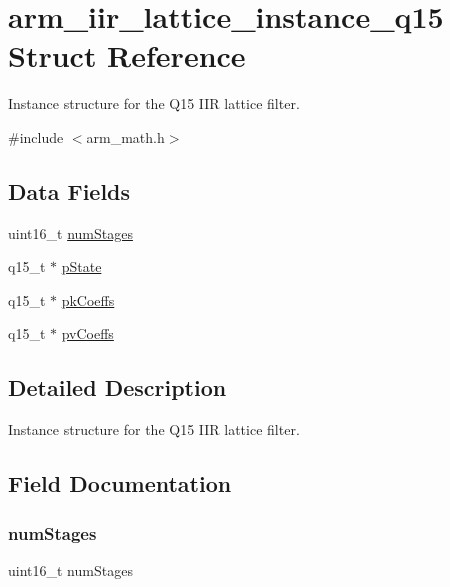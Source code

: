 \hypertarget{structarm__iir__lattice__instance__q15}{}\section{arm\+\_\+iir\+\_\+lattice\+\_\+instance\+\_\+q15 Struct Reference}
\label{structarm__iir__lattice__instance__q15}


Instance structure for the Q15 I\+IR lattice filter.  




{\ttfamily \#include $<$arm\+\_\+math.\+h$>$}

\subsection*{Data Fields}
\begin{DoxyCompactItemize}
\item 
uint16\+\_\+t \mbox{\hyperlink{structarm__iir__lattice__instance__q15_a4cceb90547b3e585d4c7aabaa8057212}{num\+Stages}}
\item 
q15\+\_\+t $\ast$ \mbox{\hyperlink{structarm__iir__lattice__instance__q15_ae29dfdb736374fcddaeaec4b7770170c}{p\+State}}
\item 
q15\+\_\+t $\ast$ \mbox{\hyperlink{structarm__iir__lattice__instance__q15_a12497c299b0341c18d497f8ab3465084}{pk\+Coeffs}}
\item 
q15\+\_\+t $\ast$ \mbox{\hyperlink{structarm__iir__lattice__instance__q15_a52866ed127c7b2a8a102e2ed1a2ebab8}{pv\+Coeffs}}
\end{DoxyCompactItemize}


\subsection{Detailed Description}
Instance structure for the Q15 I\+IR lattice filter. 

\subsection{Field Documentation}
\mbox{\label{structarm__iir__lattice__instance__q15_a4cceb90547b3e585d4c7aabaa8057212}} 
\subsubsection{\texorpdfstring{numStages}{numStages}}
{\footnotesize\ttfamily uint16\+\_\+t num\+Stages}


